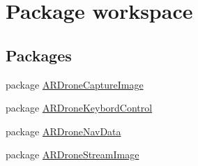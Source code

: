 \hypertarget{namespaceworkspace}{}\section{Package workspace}
\label{namespaceworkspace}
\subsection*{Packages}
\begin{DoxyCompactItemize}
\item 
package \hyperlink{namespaceworkspace_1_1_a_r_drone_capture_image}{A\+R\+Drone\+Capture\+Image}
\item 
package \hyperlink{namespaceworkspace_1_1_a_r_drone_keybord_control}{A\+R\+Drone\+Keybord\+Control}
\item 
package \hyperlink{namespaceworkspace_1_1_a_r_drone_nav_data}{A\+R\+Drone\+Nav\+Data}
\item 
package \hyperlink{namespaceworkspace_1_1_a_r_drone_stream_image}{A\+R\+Drone\+Stream\+Image}
\end{DoxyCompactItemize}
